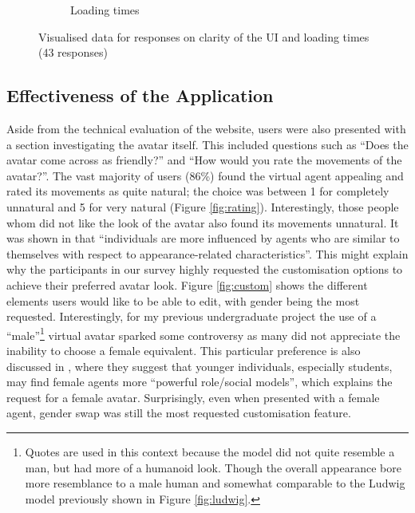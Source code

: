 \documentclass[12pt]{ociamthesis}  %
\begin{document}
\begin{figure}[H]
\begin{subfigure}[b]{.5\textwidth}
  \caption{Loading times}
  \label{}
\end{subfigure}
\caption[Visualised data for responses on clarity of the UI and loading times]{Visualised data for responses on clarity of the UI and loading times (43 responses)}
\label{fig:chart1}
\end{figure}

\subsection{Effectiveness of the Application}
Aside from the technical evaluation of the website, users were also presented with a section investigating the avatar itself. This included questions such as ``Does the avatar come across as friendly?'' and ``How would you rate the movements of the avatar?''. The vast majority of users (86\%) found the virtual agent appealing and rated its movements as quite natural; the choice was between 1 for completely unnatural and 5 for very natural (Figure \ref{fig:rating}). Interestingly, those people whom did not like the look of the avatar also found its movements unnatural. It was shown in  that ``individuals are more influenced by agents who are similar to themselves with respect to appearance-related characteristics''. This might explain why the participants in our survey highly requested the customisation options to achieve their preferred avatar look. Figure \ref{fig:custom} shows the different elements users would like to be able to edit, with gender being the most requested. Interestingly, for my previous undergraduate project the use of a ``male''\footnote{Quotes are used in this context because the model did not quite resemble a man, but had more of a humanoid look. Though the overall appearance bore more resemblance to a male human and somewhat comparable to the Ludwig model previously shown in Figure \ref{fig:ludwig}.} virtual avatar sparked some controversy as many did not appreciate the inability to choose a female equivalent. This particular preference is also discussed in , where they suggest that younger individuals, especially students, may find female agents more ``powerful role/social models'', which explains the request for a female avatar. Surprisingly, even when presented with a female agent, gender swap was still the most requested customisation feature.
\end{document}
